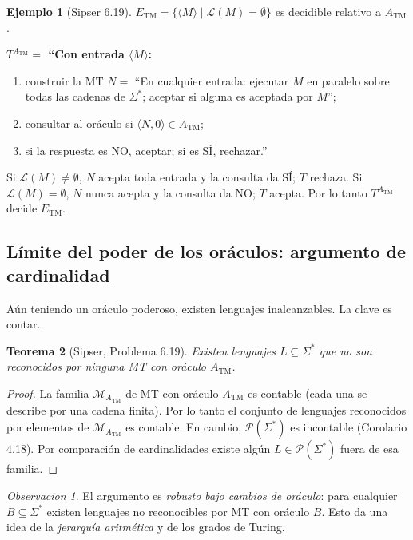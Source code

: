 \documentclass[11pt,a4paper]{article}
\theoremstyle{plain}
\newtheorem{teorema}{Teorema}[section]
\theoremstyle{definition}
\newtheorem{ejemplo}[teorema]{Ejemplo}
\theoremstyle{remark}
\newtheorem*{observacion}{Observacion}
\newcommand{\TM}{\mathrm{TM}}
\newcommand{\enc}[1]{\langle #1\rangle}
\newcommand{\lang}{\mathcal{L}}
\newcommand{\Sstar}{\Sigma^{*}}
\newcommand{\ATM}{A_{\TM}}
\newcommand{\ETM}{E_{\TM}}
\newcommand{\Powerset}{\mathcal{P}}
\begin{document}
\begin{ejemplo}[Sipser 6.19]
$\ETM = \{\enc{M} \mid \lang(M)=\emptyset\}$ es decidible relativo a $\ATM$.

\medskip\noindent\textbf{$T^{\ATM} = $ ``Con entrada $\enc{M}$:}
\begin{enumerate}
  \item construir la MT $N=$ ``En cualquier entrada: ejecutar $M$ en
        paralelo sobre todas las cadenas de $\Sstar$; aceptar si alguna es
        aceptada por $M$'';
  \item consultar al or\'aculo si $\enc{N,0}\in\ATM$;
  \item si la respuesta es NO, aceptar; si es S\'I, rechazar.''
\end{enumerate}
\medskip

\noindent Si $\lang(M)\neq\emptyset$, $N$ acepta toda entrada y la consulta
da S\'I; $T$ rechaza. Si $\lang(M)=\emptyset$, $N$ nunca acepta y la
consulta da NO; $T$ acepta. Por lo tanto $T^{\ATM}$ decide $\ETM$.
\end{ejemplo}

\subsection{L\'imite del poder de los or\'aculos: argumento de cardinalidad}

A\'un teniendo un or\'aculo poderoso, existen lenguajes inalcanzables. La
clave es contar.

\begin{teorema}[Sipser, Problema 6.19]
\label{teo:cardA_TM}
Existen lenguajes $L\subseteq\Sstar$ que no son reconocidos por ninguna MT
con or\'aculo $\ATM$.
\end{teorema}

\begin{proof}
La familia $\mathcal{M}_{\ATM}$ de MT con or\'aculo $\ATM$ es contable
(cada una se describe por una cadena finita). Por lo tanto el conjunto de
lenguajes reconocidos por elementos de $\mathcal{M}_{\ATM}$ es contable. En
cambio, $\Powerset(\Sstar)$ es incontable (Corolario 4.18). Por
comparaci\'on de cardinalidades existe alg\'un $L\in\Powerset(\Sstar)$ fuera
de esa familia.
\end{proof}

\begin{observacion}
El argumento es \emph{robusto bajo cambios de or\'aculo}: para cualquier
$B\subseteq\Sstar$ existen lenguajes no reconocibles por MT con or\'aculo
$B$. Esto da una idea de la \emph{jerarqu\'ia aritm\'etica} y de los grados
de Turing.
\end{observacion}
\end{document}
